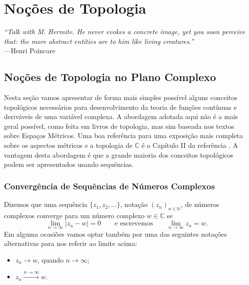 \chapter[Noções de Topologia]{Noções de Topologia}
\chaptermark{}


\hfill%
\begin{minipage}{14cm}
\begin{flushright}
\rightskip=0.5cm
\textit{``Talk with M. Hermite. He never evokes a concrete image, yet you soon perceive that: the more abstract entities are to him like living creatures.''}
\\[0.1cm]
\rightskip=0.5cm
---Henri Poincare
\end{flushright}
\end{minipage}

\section{Noções de Topologia no Plano Complexo}\label{sec-nocoes-top}

Nesta seção vamos apresentar de forma mais simples possível alguns conceitos topológicos necessários 
para desenvolvimento da teoria de funções contínuas e deriváveis de uma variável complexa.
A abordagem adotada aqui não é a mais geral possível, como feita em livros de topologia, mas sim 
baseada nos textos sobre Espaços Métricos. Uma boa referência para uma exposição mais completa 
sobre os aspectos métricos e a topologia de $\mathbb{C}$ é o Capítulo II da referência 
\cite{MR503901}. A vantagem desta abordagem é que a grande maioria dos conceitos topológicos
podem ser apresentados usando sequências. 

\subsection{Convergência de Sequências de Números Complexos}

Dizemos que uma sequência $\{z_1,z_2,\ldots\}$, notação $(z_n)_{n\in\mathbb{N}}$, 
de números complexos converge para um número complexo 
$w\in\mathbb{C}$ se 
\[
\lim_{n\to\infty} |z_n-w| = 0 \qquad\text{e escrevemos}\qquad \lim_{n\to\infty}z_n = w.
\]
Em alguma ocasiões vamos optar também por uma das seguintes notações alternativas 
para nos referir ao limite acima: 
\begin{itemize}
	\item $z_n\to w$, quando $n\to\infty$;
	\item $z_n\xrightarrow{n\to\infty}w$.
\end{itemize}

